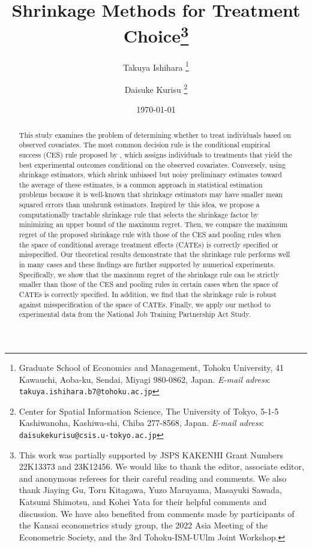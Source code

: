 \documentclass[12pt,a4paper]{article}
\title{Shrinkage Methods for Treatment Choice\footnote{This work was partially supported by JSPS KAKENHI Grant Numbers 22K13373 and 23K12456. We would like to thank the editor, associate editor, and anonymous referees for their careful reading and comments. We also thank Jiaying Gu, Toru Kitagawa, Yuzo Maruyama, Masayuki Sawada, Katsumi Shimotsu, and Kohei Yata for their helpful comments and discussion. We have also benefited from comments made by participants of the Kansai econometrics study group, the 2022 Asia Meeting of the Econometric Society, and the 3rd Tohoku-ISM-UUlm Joint Workshop.}
}
\author{Takuya Ishihara
\thanks{Graduate School of Economics and Management, Tohoku University, 41 Kawauchi, Aoba-ku, Sendai, Miyagi 980-0862, Japan. \textit{E-mail adress}: \texttt{takuya.ishihara.b7@tohoku.ac.jp}}
\and Daisuke Kurisu 
\thanks{Center for Spatial Information Science, The University of Tokyo, 5-1-5 Kashiwanoha, Kashiwa-shi, Chiba 277-8568, Japan. \textit{E-mail adress}: \texttt{daisukekurisu@csis.u-tokyo.ac.jp}}
}
\date{\today}
\begin{document}
\maketitle

\begin{abstract}
This study examines the problem of determining whether to treat individuals based on observed covariates. The most common decision rule is the conditional empirical success (CES) rule proposed by \cite{manski2004statistical}, which assigns individuals to treatments that yield the best experimental outcomes conditional on the observed covariates. Conversely, using shrinkage estimators, which shrink unbiased but noisy preliminary estimates toward the average of these estimates, is a common approach in statistical estimation problems because it is well-known that shrinkage estimators may have smaller mean squared errors than unshrunk estimators. Inspired by this idea, we propose a computationally tractable shrinkage rule that selects the shrinkage factor by minimizing an upper bound of the maximum regret. Then, we compare the maximum regret of the proposed shrinkage rule with those of the CES and pooling rules when the space of conditional average treatment effects (CATEs) is correctly specified or misspecified. Our theoretical results demonstrate that the shrinkage rule performs well in many cases and these findings are further supported by numerical experiments. Specifically, we show that the maximum regret of the shrinkage rule can be strictly smaller than those of the CES and pooling rules in certain cases when the space of CATEs is correctly specified. In addition, we find that the shrinkage rule is robust against misspecification of the space of CATEs. Finally, we apply our method to experimental data from the National Job Training Partnership Act Study.
\end{abstract}

\end{document}
